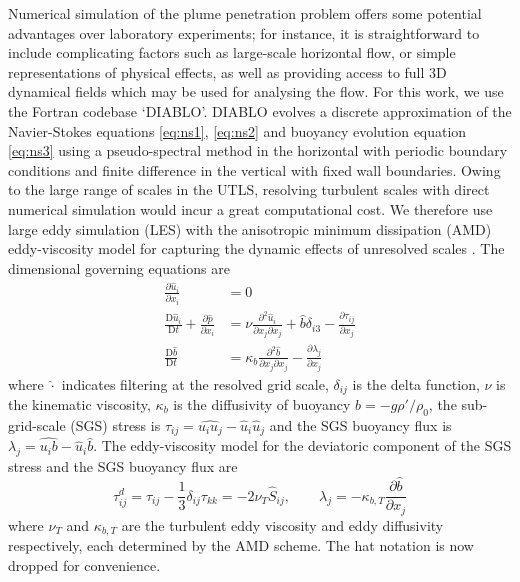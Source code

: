 \documentclass[a4paper]{article}
\begin{document}
Numerical simulation of the plume penetration problem offers some potential advantages over laboratory
experiments; for instance, it is straightforward to include complicating factors such as large-scale
horizontal flow, or simple representations of physical effects, as well as providing access to full 3D
dynamical fields which may be used for analysing the flow. For this work, we use the Fortran codebase
`DIABLO'. DIABLO evolves a discrete approximation of the Navier-Stokes equations \eqref{eq:ns1},
\eqref{eq:ns2} and buoyancy evolution equation \eqref{eq:ns3} using a pseudo-spectral method in the horizontal
with periodic boundary conditions and finite difference in the vertical with fixed wall boundaries. Owing to
the large range of scales in the UTLS, resolving turbulent scales with direct numerical simulation would incur
a great computational cost. We therefore use large eddy simulation (LES) with the anisotropic minimum
dissipation (AMD) eddy-viscosity model for capturing the dynamic effects of unresolved scales
\citep{taylor2018}. The dimensional governing equations are
\begin{align}
		\frac{\partial \widehat{u}_i}{\partial x_i} &= 0 \label{eq:ns1}\\
	\frac{\mathrm{D} \widehat{u}_i}{\mathrm{D}t} + \frac{\partial \widehat{p}}{\partial x_i} &= \nu \frac{\partial^2
		\widehat{u}_i}{\partial x_j \partial x_j} + \widehat{b}\delta_{i3} - \frac{\partial \tau_{ij}}{\partial x_j}
		\label{eq:ns2}\\
		\frac{\mathrm{D}\widehat{b}}{\mathrm{D}t} &= \kappa_b \frac{\partial^2 \widehat{b}}{\partial x_j \partial x_j}
		- \frac{\partial \lambda_j}{\partial x_j} \label{eq:ns3}
\end{align}
where $\widehat{\cdot}$ indicates filtering at the resolved grid scale, $\delta_{ij}$ is the delta function,
$\nu$ is the kinematic viscosity, $\kappa_b$ is the diffusivity of buoyancy $b = -g\rho'/\rho_0$,
the sub-grid-scale (SGS) stress is $\tau_{ij} = \widehat{u_i u_j} - \widehat{u}_i \widehat{u}_j$ and the SGS
buoyancy flux is $\lambda_j = \widehat{u_i b} - \widehat{u}_i \widehat{b}$. The eddy-viscosity model for the
deviatoric component of the SGS stress and the SGS buoyancy flux are
\begin{equation}
	\tau_{ij}^d = \tau_{ij} - \frac{1}{3}\delta_{ij}\tau_{kk} = -2\nu_T \widehat{S}_{ij}, \hspace{2em} \lambda_j =
	-\kappa_{b,T} \frac{\partial \widehat{b}}{\partial x_j}
\end{equation}
where $\nu_T$ and $\kappa_{b,T}$ are the turbulent eddy viscosity and eddy diffusivity respectively, each
determined by the AMD scheme. The hat notation is now dropped for convenience.
\end{document}
